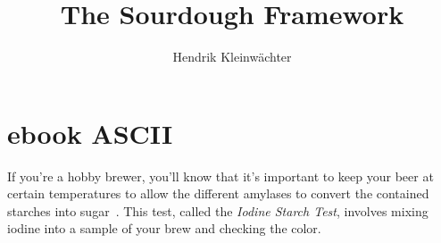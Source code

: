 \documentclass[paper=a4, twoside=false, fontsize=12pt, parskip=half,
                bibliography=totoc, listof=totoc]{scrbook}
\author{Hendrik Kleinwächter}
\title{The Sourdough Framework}
\begin{document}
%
\titlepage

{%
 \hypersetup{hidelinks}
 \ifdefined\HCode\else\tableofcontents\fi
}

\chapter{ebook ASCII}
If you're a hobby brewer, you'll know that it's important to keep your beer at
certain temperatures to allow the different amylases to convert the contained
starches into sugar~\cite{beer+amylase}.
This test, called the \emph{Iodine Starch Test}, involves mixing iodine into
a sample of your brew and checking the color.

\printbibliography
\end{document}
